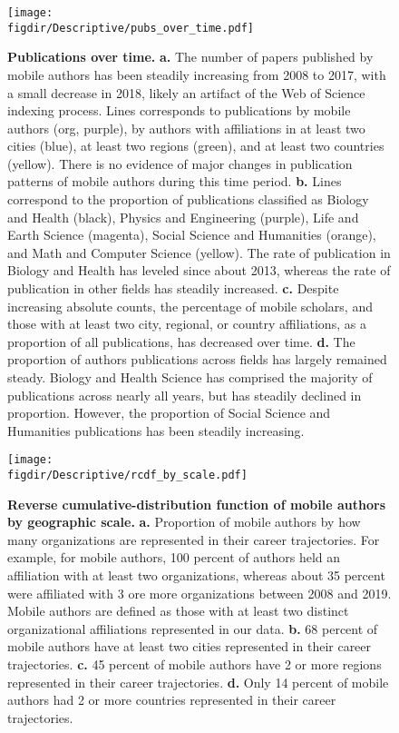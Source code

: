 \documentclass[12pt]{article} %
\def\figdir{../Figs}
\begin{document}
%
%
\begin{figure}[p!]
	\centering
	\label{fig:supp:pubs_over_time}
	\texttt{[image: \\figdir/Descriptive/pubs\_over\_time.pdf]}
	\caption{
		\textbf{Publications over time.}
		\textbf{a.}
		The number of papers published by mobile authors has been steadily increasing from 2008 to 2017, with a small decrease in 2018,  likely an artifact of the Web of Science indexing process.
		Lines corresponds to publications by mobile authors (org, purple), by authors with affiliations in at least two cities (blue), at least two regions (green), and at least two countries (yellow).
		There is no evidence of major changes in publication patterns of mobile authors during this time period. 
		\textbf{b.}
		Lines correspond to the proportion of publications classified as Biology and Health (black), Physics and Engineering (purple), Life and Earth Science (magenta), Social Science and Humanities (orange), and Math and Computer Science (yellow).
		The rate of publication in Biology and Health has leveled since about 2013, whereas the rate of publication in other fields has steadily increased. 
		\textbf{c.} 
		Despite increasing absolute counts, the percentage of mobile scholars, and those with at least two city, regional, or country affiliations, as a proportion of all publications, has decreased over time. 
		\textbf{d.} 
		The proportion of authors publications across fields has largely remained steady.
		Biology and Health Science has comprised the majority of publications across nearly all years, but has steadily declined in proportion. 
		However, the proportion of Social Science and Humanities publications has been steadily increasing. 
	}
\end{figure}


\newpage
%
%
\begin{figure}[p!]
	\centering
	\label{fig:supp:rcdf_by_scale}
	\texttt{[image: \\figdir/Descriptive/rcdf\_by\_scale.pdf]}
	\caption{
		\textbf{Reverse cumulative-distribution function of mobile authors by geographic scale.}
		\textbf{a.}
		Proportion of mobile authors by how many organizations are represented 	in their career trajectories. 
		For example, for mobile authors, 100 percent of authors held an affiliation with at least two organizations, whereas about 35 percent were affiliated with 3 ore more organizations between 2008 and 2019.
		Mobile authors are defined as those with at least two distinct organizational affiliations represented in our data. 
		\textbf{b.} 68 percent of mobile authors have at least two cities represented in their career trajectories.
		\textbf{c.} 45 percent of mobile authors have 2 or more regions represented in their career trajectories.
		\textbf{d.} Only 14 percent of mobile authors had 2 or more countries represented in their career trajectories. 
	}
\end{figure}
\end{document}
